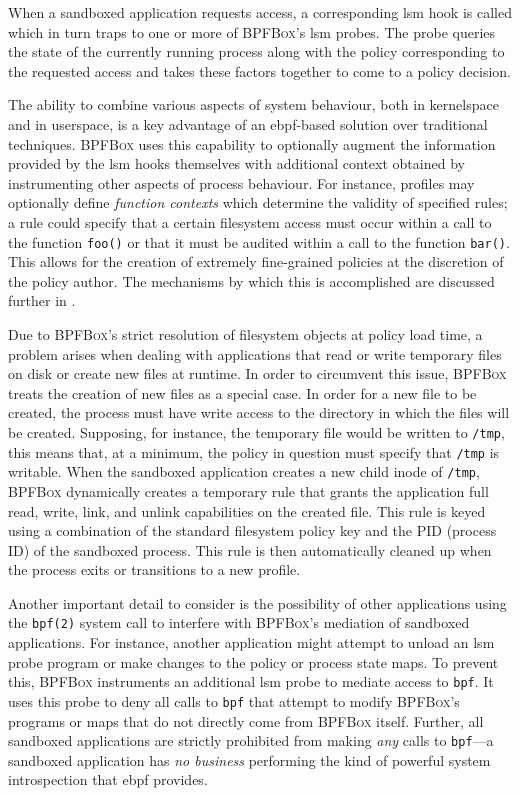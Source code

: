 \documentclass[
  fontsize=12pt,
  titlepage=firstiscover,
  paper=letter,
oneside,
  cleardoublepage=plain,
  parskip=half-,
  DIV=10,
  parindent,
  appendixprefix,
  chapterprefix,
  listof=totoc,
]{scrbook}
\newcommand{\bpfbox}{\textsc{BPFBox}}
\begin{document}
When a sandboxed application requests access, a corresponding \gls{lsm} hook is called which in
turn traps to one or more of \bpfbox{}'s \gls{lsm} probes. The probe queries the state of the
currently running process along with the policy corresponding to the requested access and
takes these factors together to come to a policy decision.



The ability to combine various aspects of system behaviour, both in kernelspace and in
userspace, is a key advantage of an \gls{ebpf}-based solution over traditional techniques.
\bpfbox{} uses this capability to optionally augment the information provided by the
\gls{lsm} hooks themselves with additional context obtained by instrumenting other aspects
of process behaviour. For instance, profiles may optionally define \textit{function
contexts} which determine the validity of specified rules; a rule could specify that
a certain filesystem access must occur within a call to the function \texttt{foo()} or
that it must be audited within a call to the function \texttt{bar()}. This allows for the
creation of extremely fine-grained policies at the discretion of the policy author. The
mechanisms by which this is accomplished are discussed further in .

Due to \bpfbox{}'s strict resolution of filesystem objects at policy load time, a problem
arises when dealing with applications that read or write temporary files on disk or create
new files at runtime. In order to circumvent this issue, \bpfbox{} treats the creation of
new files as a special case. In order for a new file to be created, the process must have
write access to the directory in which the files will be created.  Supposing, for
instance, the temporary file would be written to \texttt{/tmp}, this means that, at
a minimum, the policy in question must specify that \texttt{/tmp} is writable.  When the
sandboxed application creates a new child inode of \texttt{/tmp}, \bpfbox{} dynamically
creates a temporary rule that grants the application full read, write, link, and unlink
capabilities on the created file. This rule is keyed using a combination of the standard
filesystem policy key and the PID (process ID) of the sandboxed process. This rule is then
automatically cleaned up when the process exits or transitions to a new profile.

Another important detail to consider is the possibility of other applications using the
\texttt{bpf(2)} system call to interfere with \bpfbox{}'s mediation of sandboxed
applications. For instance, another application might attempt to unload an \gls{lsm} probe
program or make changes to the policy or process state maps. To prevent this, \bpfbox{}
instruments an additional \gls{lsm} probe to mediate access to \texttt{bpf}. It uses this probe
to deny all calls to \texttt{bpf} that attempt to modify \bpfbox{}'s programs or maps that
do not directly come from \bpfbox{} itself. Further, all sandboxed applications are
strictly prohibited from making \textit{any} calls to \texttt{bpf}---a sandboxed
application has \textit{no business} performing the kind of powerful system introspection
that \gls{ebpf} provides.
\end{document}
